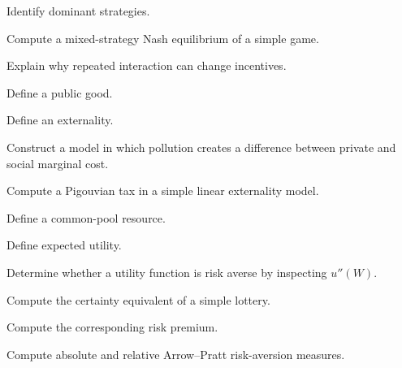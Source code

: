 \begin{exercise}[2]
Identify dominant strategies.
\end{exercise}

\begin{exercise}[3]
Compute a mixed-strategy Nash equilibrium of a simple game.
\end{exercise}

\begin{exercise}[3]
Explain why repeated interaction can change incentives.
\end{exercise}

\begin{exercise}[2]
Define a public good.
\end{exercise}

\begin{exercise}[2]
Define an externality.
\end{exercise}

\begin{exercise}[3]
Construct a model in which pollution creates a difference between private
and social marginal cost.
\end{exercise}

\begin{exercise}[3]
Compute a Pigouvian tax in a simple linear externality model.
\end{exercise}

\begin{exercise}[2]
Define a common-pool resource.
\end{exercise}

\begin{exercise}[2]
Define expected utility.
\end{exercise}

\begin{exercise}[2]
Determine whether a utility function is risk averse by inspecting
\(u''(W)\).
\end{exercise}

\begin{exercise}[3]
Compute the certainty equivalent of a simple lottery.
\end{exercise}

\begin{exercise}[3]
Compute the corresponding risk premium.
\end{exercise}

\begin{exercise}[3]
Compute absolute and relative Arrow--Pratt risk-aversion measures.
\end{exercise}

